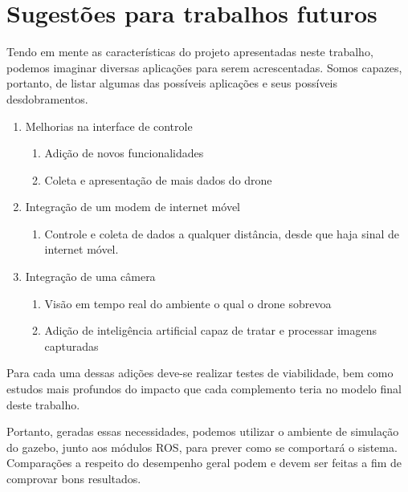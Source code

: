 \documentclass[12pt,a4paper,oneside]{book}
\begin{document}
\chapter{Sugestões para trabalhos futuros}
%
\thispagestyle{empty} 
%
%
Tendo em mente as características do projeto apresentadas neste trabalho, podemos imaginar diversas aplicações para serem acrescentadas. Somos capazes, portanto, de listar algumas das possíveis aplicações e seus possíveis desdobramentos.
%
\begin{enumerate}
    \item Melhorias na interface de controle 
        \begin{enumerate}
            \item Adição de novos funcionalidades
            \item Coleta e apresentação de mais dados do drone  
        \end{enumerate}
    \item Integração de um modem de internet móvel
        \begin{enumerate}
            \item Controle e coleta de dados a qualquer distância, desde que haja sinal de internet móvel.
        \end{enumerate}
    \item Integração de uma câmera
        \begin{enumerate}
            \item Visão em tempo real do ambiente o qual o drone sobrevoa
            \item Adição de inteligência artificial capaz de tratar e processar imagens capturadas
        \end{enumerate}
\end{enumerate}

Para cada uma dessas adições deve-se realizar testes de viabilidade, bem como estudos mais profundos do impacto que cada complemento teria no modelo final deste trabalho. 

Portanto, geradas essas necessidades, podemos utilizar o ambiente de simulação do gazebo, junto aos módulos ROS, para prever como se comportará o sistema. Comparações a respeito do desempenho geral podem e devem ser feitas a fim de comprovar bons resultados.



\end{document}
